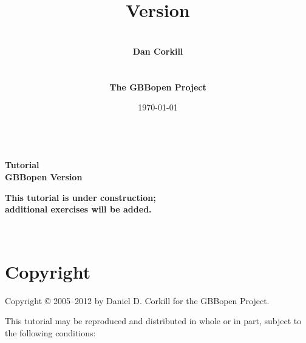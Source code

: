 \documentclass[10pt,twoside,english,pdftex]{article}
\title{\vspace{3in}{\LARGE\textbf{GBBopen Tutorial}}\\[14pt] 
{\Large\textbf{Version \gbbopenversion}}}
\author{\vspace{1in}~\\{\Large\textbf{Dan Corkill}}\\~\\~\\
  {\Large\textbf{The GBBopen Project}}\\[4pt]
  {\large\textbf{\xsitelink{http://GBBopen.org}{http://GBBopen.org}}}}
\date{\today\\[4pt] \hhmm~\timezone}
\newcommand{\inprogress}{\vfill\textcolor{darkergray}{\textsf{\textbf{This
        tutorial is under construction;\\additional exercises will be added.}}}}
\begin{document}
\T{}
\T\pagestyle{plain}
\T\thispagestyle{empty}
\T\raggedright
\T\sloppy
\T{}\baselineskip
\T\parindent=0pt
\T\maketitle
\T\renewcommand{\headrulewidth}{0pt}

\T\begin{ifhtml}
{\LARGE\bf Tutorial}\\
{\large\bf GBBopen Version \gbbopenversion}
\T\end{ifhtml}

\begin{center}
\inprogress\\
\end{center}


\T\begin{ifhtml}
  \label{sec:introduction}%
  
  \setcounter{htmlautomenu}{0}
\T\end{ifhtml}

\T\thispagestyle{empty}


\T\newpage
\T~
\T\vfill
\W{}
\W\section*{Copyright}

Copyright \copyright{} 2005--2012 by Daniel D. Corkill for the
GBBopen Project.

This tutorial may be reproduced and distributed in whole or in
part, subject to the following conditions: 
\end{document}
